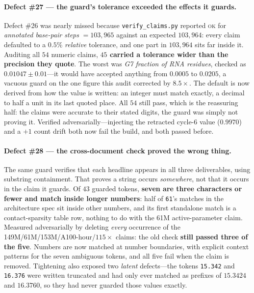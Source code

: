 \documentclass[11pt,a4paper]{article}
\begin{document}
\paragraph{Defect \#27 --- the guard's tolerance exceeded the effects it guards.}
Defect \#26 was nearly missed because \texttt{verify\_claims.py} reported
\textsc{ok} for \emph{annotated base-pair steps} $=103{,}965$ against an expected
$103{,}964$: every claim defaulted to a $0.5\%$ \emph{relative} tolerance, and one
part in $103{,}964$ sits far inside it. Auditing all $54$ numeric claims,
\textbf{$45$ carried a tolerance wider than the precision they quote}. The worst
was \emph{G7 fraction of RNA residues}, checked as $0.01047 \pm 0.01$---it would
have accepted anything from $0.0005$ to $0.0205$, a vacuous guard on the one
figure this audit corrected by $8.5\times$. The default is now derived from how
the value is written: an integer must match exactly, a decimal to half a unit in
its last quoted place. All $54$ still pass, which is the reassuring half: the
claims were accurate to their stated digits, the guard was simply not proving it.
Verified adversarially---injecting the retracted cycle-6 value ($0.9970$) and a
$+1$ count drift both now fail the build, and both passed before.

\paragraph{Defect \#28 --- the cross-document check proved the wrong thing.} The
same guard verifies that each headline appears in all three deliverables, using
substring containment. That proves a string occurs \emph{somewhere}, not that it
occurs in the claim it guards. Of $43$ guarded tokens, \textbf{seven are three
characters or fewer and match inside longer numbers}: half of \texttt{61}'s
matches in the architecture spec sit inside other numbers, and its first
standalone match is a contact-sparsity table row, nothing to do with the 61M
active-parameter claim. Measured adversarially by deleting \emph{every}
occurrence of the 149M/61M/153M/A100-hour/$115\times$ claims: the old check
\textbf{still passed three of the five}. Numbers are now matched at number
boundaries, with explicit context patterns for the seven ambiguous tokens, and
all five fail when the claim is removed. Tightening also exposed two
\emph{latent} defects---the tokens \texttt{15.342} and \texttt{16.376} were
written truncated and had only ever matched as prefixes of $15.3424$ and
$16.3760$, so they had never guarded those values exactly.
\end{document}
